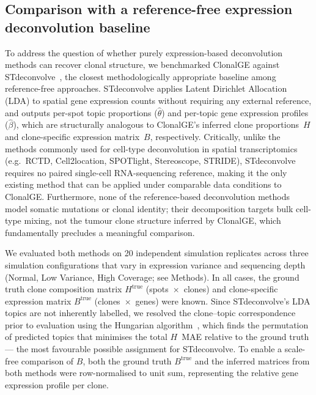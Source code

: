 \documentclass[unnumsec,webpdf,contemporary,large]{oup-authoring-template}%
\theoremstyle{thmstyleone}%
\theoremstyle{thmstyletwo}%
\theoremstyle{thmstylethree}%
\begin{document}
\subsection*{Comparison with a reference-free expression deconvolution baseline}

To address the question of whether purely expression-based deconvolution
methods can recover clonal structure, we benchmarked ClonalGE against
STdeconvolve~\cite{miller2022stdeconvolve}, the closest methodologically
appropriate baseline among reference-free approaches.
%
STdeconvolve applies Latent Dirichlet Allocation (LDA) to spatial gene
expression counts without requiring any external reference, and outputs
per-spot topic proportions ($\hat{\theta}$) and per-topic gene expression
profiles ($\hat{\beta}$), which are structurally analogous to ClonalGE's
inferred clone proportions~$H$ and clone-specific expression matrix~$B$,
respectively.
%
Critically, unlike the methods commonly used for cell-type deconvolution
in spatial transcriptomics (e.g.\ RCTD, Cell2location, SPOTlight,
Stereoscope, STRIDE), STdeconvolve requires no paired single-cell
RNA-sequencing reference, making it the only existing method that can
be applied under comparable data conditions to ClonalGE.
%
Furthermore, none of the reference-based deconvolution methods model
somatic mutations or clonal identity; their decomposition targets
bulk cell-type mixing, not the tumour clone structure inferred
by ClonalGE, which fundamentally precludes a meaningful comparison.

We evaluated both methods on 20 independent simulation replicates across
three simulation configurations that vary in expression variance and
sequencing depth (Normal, Low Variance, High Coverage; see Methods).
%
In all cases, the ground truth clone composition matrix $H^{\text{true}}$
(spots~$\times$~clones) and clone-specific expression matrix $B^{\text{true}}$
(clones~$\times$~genes) were known.
%
Since STdeconvolve's LDA topics are not inherently labelled, we resolved
the clone--topic correspondence prior to evaluation using the Hungarian
algorithm~\cite{kuhn1955hungarian}, which finds the permutation of predicted
topics that minimises the total $H$~MAE relative to the ground truth --- the
most favourable possible assignment for STdeconvolve.
%
To enable a scale-free comparison of $B$, both the ground truth $B^{\text{true}}$
and the inferred matrices from both methods were row-normalised to unit sum,
representing the relative gene expression profile per clone.
\end{document}
